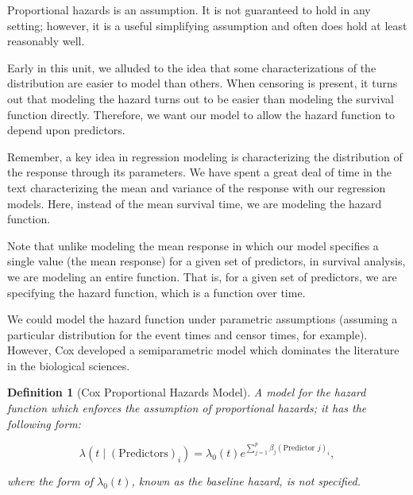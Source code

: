 \documentclass[
]{book}
\theoremstyle{plain}
\theoremstyle{mydefn}
\newtheorem{definition}{Definition}[chapter]
\theoremstyle{myexmpl}
\theoremstyle{remark}
\begin{document}
\begin{rmdwarning}
Proportional hazards is an assumption. It is not guaranteed to hold in any setting; however, it is a useful simplifying assumption and often does hold at least reasonably well.
\end{rmdwarning}

Early in this unit, we alluded to the idea that some characterizations of the distribution are easier to model than others. When censoring is present, it turns out that modeling the hazard turns out to be easier than modeling the survival function directly. Therefore, we want our model to allow the hazard function to depend upon predictors.

\begin{rmdtip}
Remember, a key idea in regression modeling is characterizing the distribution of the response through its parameters. We have spent a great deal of time in the text characterizing the mean and variance of the response with our regression models. Here, instead of the mean survival time, we are modeling the hazard function.
\end{rmdtip}

\begin{rmdtip}
Note that unlike modeling the mean response in which our model specifies a single value (the mean response) for a given set of predictors, in survival analysis, we are modeling an entire function. That is, for a given set of predictors, we are specifying the hazard function, which is a function over time.
\end{rmdtip}

We could model the hazard function under parametric assumptions (assuming a particular distribution for the event times and censor times, for example). However, Cox developed a semiparametric model which dominates the literature in the biological sciences.

\begin{definition}[Cox Proportional Hazards Model]
\protect\hypertarget{def:defn-cph}{}{\label{def:defn-cph} {} }A model for the hazard function which enforces the assumption of proportional hazards; it has the following form:

\[\lambda\left(t \mid (\text{Predictors})_i\right) = \lambda_0(t) e^{\sum\limits_{j=1}^{p} \beta_j (\text{Predictor } j)_i},\]

where the form of \(\lambda_0(t)\), known as the baseline hazard, is not specified.
\end{definition}
\end{document}
